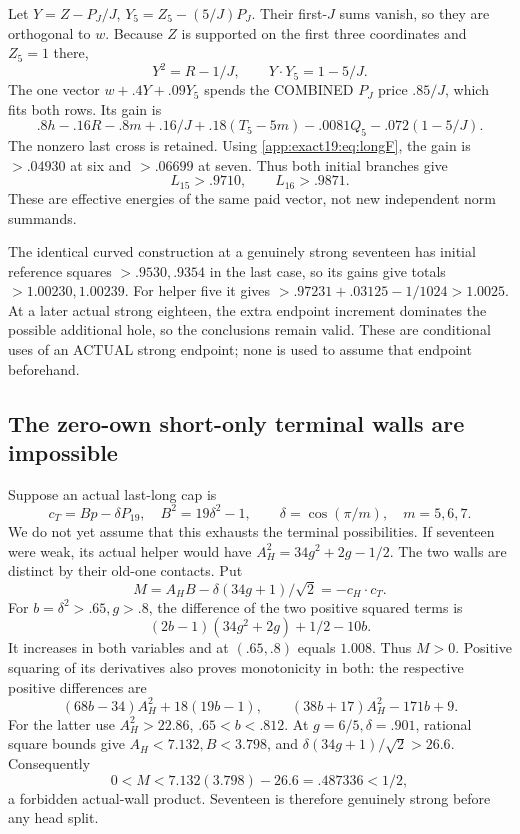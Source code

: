 \documentclass[11pt]{article}
\theoremstyle{definition}
\theoremstyle{remark}
\begin{document}
Let \(Y=Z-P_J/J\),
\(Y_5=Z_5-(5/J)P_J\).
Their first-\(J\) sums vanish,
so they are orthogonal to \(w\).
Because \(Z\) is supported on the
first three coordinates and
\(Z_5=1\) there,
\[
             Y^2=R-1/J,\qquad Y\cdot Y_5=1-5/J .
\]
The one vector \(w+.4Y+.09Y_5\)
spends the COMBINED
\(P_J\) price \(.85/J\), which
fits both rows.
Its gain is
\[
 .8h-.16R-.8m+.16/J
 +.18(T_5-5m)-.0081Q_5-.072(1-5/J).
\]
The nonzero last cross is retained.
Using \eqref{app:exact19:eq:longF},
the gain is \(>.04930\) at six
and \(>.06699\) at seven.
Thus both initial branches give
\[
                         L_{15}>.9710,\qquad L_{16}>.9871 .
\]
These are effective energies of
the same paid vector, not new
independent norm summands.

The identical curved construction
at a genuinely strong seventeen
has initial reference squares
\(>.9530,.9354\) in the last case,
so its gains give totals
\(>1.00230,1.00239\).
For helper five it gives
\(>.97231+.03125-1/1024>1.0025\).
At a later actual strong eighteen,
the extra endpoint increment
dominates the possible additional
hole, so the conclusions remain
valid.
These are conditional uses of
an ACTUAL strong endpoint;
none is used to assume that
endpoint beforehand.


\subsection{The zero-own short-only terminal walls are impossible}
\label{app:exact19:Bzeroown}

Suppose an actual last-long cap is
\[
 c_T=Bp-\delta P_{19},\quad B^2=19\delta^2-1,\qquad
                 \delta=\cos(\pi/m),\quad m=5,6,7 .
\]
We do not yet assume that this
exhausts the terminal possibilities.
If seventeen were weak, its actual
helper would have
\(A_H^2=34g^2+2g-1/2\).
The two walls are distinct by their
old-one contacts.
Put
\[
 M=A_HB-\delta(34g+1)/\sqrt2=-c_H\cdot c_T .
\]
For \(b=\delta^2>.65,g>.8\), the
difference of the two positive
squared terms is
\[
                 (2b-1)(34g^2+2g)+1/2-10b .
\]
It increases in both variables
and at \((.65,.8)\) equals \(1.008\).
Thus \(M>0\).
Positive squaring of its derivatives
also proves monotonicity in both:
the respective positive differences
are
\[
 (68b-34)A_H^2+18(19b-1),\qquad
                 (38b+17)A_H^2-171b+9 .
\]
For the latter use \(A_H^2>22.86\),
\(.65<b<.812\).
At \(g=6/5,\delta=.901\), rational
square bounds give
\(A_H<7.132,B<3.798\), and
\(\delta(34g+1)/\sqrt2>26.6\).
Consequently
\[
                     0<M<7.132(3.798)-26.6
                             =.487336<1/2 ,
\]
a forbidden actual-wall product.
Seventeen is therefore genuinely
strong before any head split.
\end{document}
